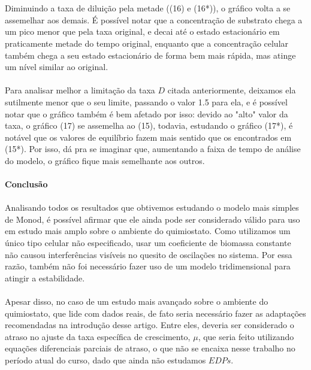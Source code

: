 \documentclass{article}
\begin{document}
\\\\Diminuindo a taxa de diluição pela metade ((16) e (16*)), o gráfico volta a se assemelhar aos demais. É possível notar que a concentração de substrato chega a um pico menor que pela taxa original, e decai até o estado estacionário em praticamente metade do tempo original, enquanto que a concentração celular também chega a seu estado estacionário de forma bem mais rápida, mas atinge um nível similar ao original. 
\\\\Para analisar melhor a limitação da taxa $D$ citada anteriormente, deixamos ela sutilmente menor que o seu limite, passando o valor 1.5 para ela, e é possível notar que o gráfico também é bem afetado por isso: devido ao "alto" valor da taxa, o gráfico (17) se assemelha ao (15), todavia, estudando o gráfico (17*), é notável que os valores de equilíbrio fazem mais sentido que os encontrados em (15*). Por isso, dá pra se imaginar que, aumentando a faixa de tempo de análise do modelo, o gráfico fique mais semelhante aos outros.
\\\\
\textbf{\Large{Conclusão}}
\\\\Analisando todos os resultados que obtivemos estudando o modelo mais simples de Monod, é possível afirmar que ele ainda pode ser considerado válido para uso em estudo mais amplo sobre o ambiente do quimiostato. Como utilizamos um único tipo celular não especificado, usar um coeficiente de biomassa constante não causou interferências visíveis no quesito de oscilações no sistema. Por essa razão, também não foi necessário fazer uso de um modelo tridimensional para atingir a estabilidade.
\\\\Apesar disso, no caso de um estudo mais avançado sobre o ambiente do quimiostato, que lide com dados reais, de fato seria necessário fazer as adaptações recomendadas na introdução desse artigo. Entre eles, deveria ser considerado o atraso no ajuste da taxa específica de crescimento, $\mu$, que seria feito utilizando equações diferenciais parciais de atraso, o que não se encaixa nesse trabalho no período atual do curso, dado que ainda não estudamos $EDPs$. 

\newpage
\end{document}

